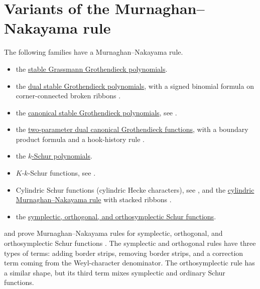 \section[murnaghanNakayamaVariants]{Variants of the Murnaghan--Nakayama rule}

The following families have a Murnaghan--Nakayama rule.

\begin{itemize}

\item the \hyperref[grothendieckStableMN]{stable Grassmann Grothendieck polynomials}.

\item the \hyperref[grothendieckDualStableMN]{dual stable Grothendieck
polynomials}, with a signed binomial formula on corner-connected broken
ribbons \cite{HiepThuy2026x}.

\item the \hyperref[grothendieckCanonical]{canonical stable Grothendieck
polynomials}, see \cite{Kundu2025x}.

\item the \hyperref[grothendieckCanonicalMN]{two-parameter dual canonical
Grothendieck functions}, with a boundary product formula and a hook-history
rule \cite{KunduPattanayak2026x}.

\item the \hyperref[kSchurMurnaghanNakayama]{$k$-Schur polynomials}.

\item $K\text{-}k$-Schur functions, see \cite{Nguyen2022x}.

\item Cylindric Schur functions (cylindric Hecke characters), see
\cite[Lem.~5.3]{Korff2020}, and the
\hyperref[cylindricMurnaghanNakayama]{cylindric Murnaghan--Nakayama rule}
with stacked ribbons \cite[Thm.~16]{AlexanderssonOguz2023x}.

\item the \hyperref[schurSymplecticMurnaghanNakayama]{symplectic, orthogonal,
and orthosymplectic Schur functions}.

\end{itemize}

 and  prove Murnaghan--Nakayama rules for
symplectic, orthogonal, and orthosymplectic Schur functions
\cite{KumariStokke2026}.  The symplectic and orthogonal rules have three
types of terms: adding border strips, removing border strips, and a correction
term coming from the Weyl-character denominator.  The orthosymplectic rule has
a similar shape, but its third term mixes symplectic and ordinary Schur
functions.

